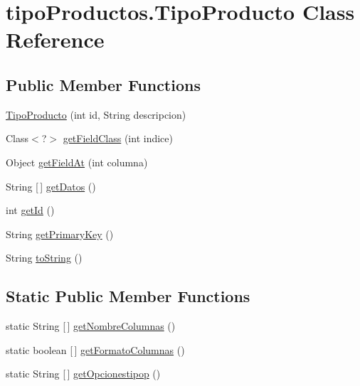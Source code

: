 \hypertarget{classtipo_productos_1_1_tipo_producto}{}\section{tipo\+Productos.\+Tipo\+Producto Class Reference}
\label{classtipo_productos_1_1_tipo_producto}
\subsection*{Public Member Functions}
\begin{DoxyCompactItemize}
\item 
\mbox{\hyperlink{classtipo_productos_1_1_tipo_producto_abc3130af94301f568e71a09729690060}{Tipo\+Producto}} (int id, String descripcion)
\item 
Class$<$?$>$ \mbox{\hyperlink{classtipo_productos_1_1_tipo_producto_acf09300124ea0bcf0ff83000d18a95dc}{get\+Field\+Class}} (int indice)
\item 
Object \mbox{\hyperlink{classtipo_productos_1_1_tipo_producto_a6e1ecdc3c8d5f65c0859485418e14cd6}{get\+Field\+At}} (int columna)
\item 
String \mbox{[}$\,$\mbox{]} \mbox{\hyperlink{classtipo_productos_1_1_tipo_producto_a85837c84193d02f0ed6b43809c09e13e}{get\+Datos}} ()
\item 
int \mbox{\hyperlink{classtipo_productos_1_1_tipo_producto_aede2d99770807b639e1e3f9f75dd2f65}{get\+Id}} ()
\item 
String \mbox{\hyperlink{classtipo_productos_1_1_tipo_producto_aca3b6c0276f1694c3032a7a512ac0910}{get\+Primary\+Key}} ()
\item 
String \mbox{\hyperlink{classtipo_productos_1_1_tipo_producto_aae44943664780128543661f741a3089b}{to\+String}} ()
\end{DoxyCompactItemize}
\subsection*{Static Public Member Functions}
\begin{DoxyCompactItemize}
\item 
static String \mbox{[}$\,$\mbox{]} \mbox{\hyperlink{classtipo_productos_1_1_tipo_producto_a09ad6d5a9a33a7822d51ad9134aa670e}{get\+Nombre\+Columnas}} ()
\item 
static boolean \mbox{[}$\,$\mbox{]} \mbox{\hyperlink{classtipo_productos_1_1_tipo_producto_ad2401fcfc8d348edc222e4a39ad00179}{get\+Formato\+Columnas}} ()
\item 
static String \mbox{[}$\,$\mbox{]} \mbox{\hyperlink{classtipo_productos_1_1_tipo_producto_a9202294408afa6fde0a50eb4ac09c7de}{get\+Opcionestipop}} ()
\end{DoxyCompactItemize}


